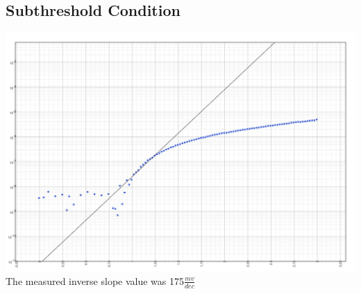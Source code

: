 \documentclass[12pt, oneside]{article}
\begin{document}
\subsection{Subthreshold Condition}
	\begin{center}
		\includegraphics[scale=.4]{NFET_b}\\
		The measured inverse slope value was 175$\frac{mv}{dec}$
	\end{center}
\end{document}
